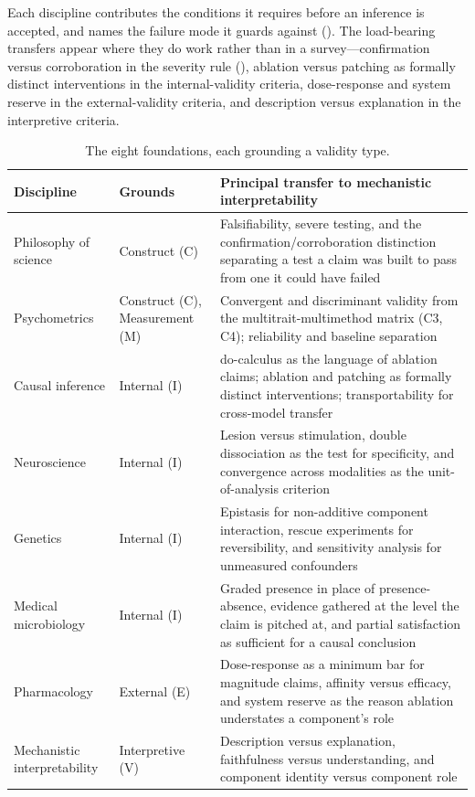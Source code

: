 \documentclass{article}
\begin{document}
Each discipline contributes the conditions it requires before an inference is accepted, and names the failure mode it guards against (). The load-bearing transfers appear where they do work rather than in a survey---confirmation versus corroboration in the severity rule (), ablation versus patching as formally distinct interventions in the internal-validity criteria, dose-response and system reserve in the external-validity criteria, and description versus explanation in the interpretive criteria.

\begin{table}[h]
\centering\small
\caption{The eight foundations, each grounding a validity type.}
\label{tab:foundations-summary}
\renewcommand{\arraystretch}{1.15}
\begin{tabular}{@{}ll>{\raggedright\arraybackslash}p{7.2cm}@{}}
\toprule
\textbf{Discipline} & \textbf{Grounds} & \textbf{Principal transfer to mechanistic interpretability} \\
\midrule
Philosophy of science & Construct (C) & Falsifiability, severe testing, and the confirmation/corroboration distinction separating a test a claim was built to pass from one it could have failed \\
\midrule
Psychometrics & Construct (C), Measurement (M) & Convergent and discriminant validity from the multitrait-multimethod matrix (C3, C4); reliability and baseline separation \\
\midrule
Causal inference & Internal (I) & do-calculus as the language of ablation claims; ablation and patching as formally distinct interventions; transportability for cross-model transfer \\
\midrule
Neuroscience & Internal (I) & Lesion versus stimulation, double dissociation as the test for specificity, and convergence across modalities as the unit-of-analysis criterion \\
\midrule
Genetics & Internal (I) & Epistasis for non-additive component interaction, rescue experiments for reversibility, and sensitivity analysis for unmeasured confounders \\
\midrule
Medical microbiology & Internal (I) & Graded presence in place of presence-absence, evidence gathered at the level the claim is pitched at, and partial satisfaction as sufficient for a causal conclusion \\
\midrule
Pharmacology & External (E) & Dose-response as a minimum bar for magnitude claims, affinity versus efficacy, and system reserve as the reason ablation understates a component's role \\
\midrule
Mechanistic interpretability & Interpretive (V) & Description versus explanation, faithfulness versus understanding, and component identity versus component role \\
\bottomrule
\end{tabular}
\end{table}
\end{document}
